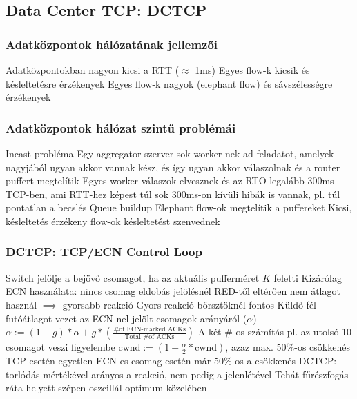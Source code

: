 \documentclass[12pt,a4paper]{article}
\begin{document}
\pagebreak

\subsection{Data Center TCP: DCTCP}

\subsubsection{Adatközpontok hálózatának jellemzői}

\begin{outline}
	\1 Adatközpontokban nagyon kicsi a RTT ($\approx$ 1ms)
	\1 Egyes flow-k kicsik és késleltetésre érzékenyek
	\1 Egyes flow-k nagyok (elephant flow) és sávszélességre érzékenyek
\end{outline}

\subsubsection{Adatközpontok hálózat szintű problémái}

\begin{outline}
	\1 Incast probléma
		\2 Egy aggregator szerver sok worker-nek ad feladatot, amelyek nagyjából ugyan akkor vannak kész, és így ugyan akkor válaszolnak és a router puffert megtelítik
		\2 Egyes worker válaszok elvesznek és az RTO legalább 300ms TCP-ben, ami RTT-hez képest túl sok
		\2 300ms-on kívüli hibák is vannak, pl. túl pontatlan a becslés
	\1 Queue buildup
		\2 Elephant flow-ok megtelítik a puffereket
		\2 Kicsi, késleltetés érzékeny flow-ok késleltetést szenvednek
\end{outline}

\subsubsection{DCTCP: TCP/ECN Control Loop}

\begin{outline}
	\1 Switch jelölje a bejövő csomagot, ha az aktuális pufferméret $K$ feletti
		\2 Kizárólag ECN használata: nincs csomag eldobás jelölésnél
		\2 RED-től eltérően nem átlagot használ $\implies$ gyorsabb reakció
		\2 Gyors reakció börsztöknél fontos
	\1 Küldő fél futóátlagot vezet az ECN-nel jelölt csomagok arányáról ($\alpha$)
		\2 $\alpha := (1-g)*\alpha + g*(\frac{\text{\# of ECN-marked ACKs}}{\text{Total \# of ACKs}})$
			\3 A két $\#$-os számítás pl. az utolsó 10 csomagot veszi figyelembe
		\2 $\text{cwnd} := (1-\frac{\alpha}{2} * \text{cwnd})$, azaz max. 50\%-os csökkenés
		\2 TCP esetén egyetlen ECN-es csomag esetén már 50\%-os a csökkenés
		\2 DCTCP: torlódás mértékével arányos a reakció, nem pedig a jelenlétével
		\2 Tehát fűrészfogás ráta helyett szépen oszcillál optimum közelében
\end{outline}
\end{document}
